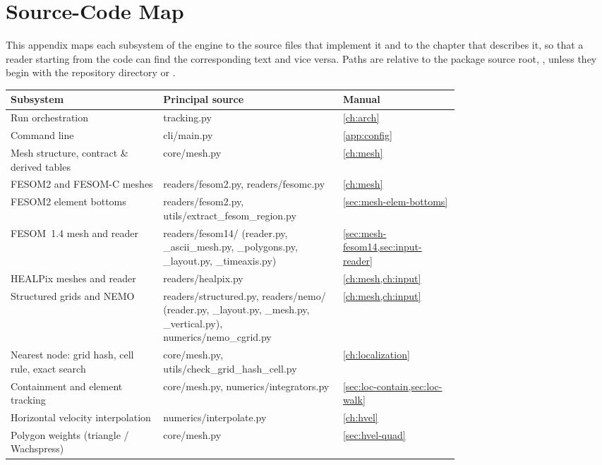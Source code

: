\chapter{Source-Code Map}\label{app:codemap}

This appendix maps each subsystem of the engine to the source files that implement it and to the chapter that
describes it, so that a reader starting from the code can find the corresponding text and vice versa. Paths are
relative to the package source root, , unless they begin with the repository directory
 or .

\begin{longtable}{@{}>{\footnotesize}p{0.34\linewidth} >{\ttfamily\footnotesize\raggedright\arraybackslash}p{0.40\linewidth} >{\footnotesize}l@{}}
\toprule
\normalfont Subsystem & \normalfont Principal source & \normalfont Manual \\
\midrule \endhead
Run orchestration & tracking.py & \cref{ch:arch} \\
Command line & cli/main.py & \cref{app:config} \\
Mesh structure, contract \& derived tables & core/mesh.py & \cref{ch:mesh} \\
FESOM2 and FESOM-C meshes & readers/fesom2.py, readers/fesomc.py & \cref{ch:mesh} \\
FESOM2 element bottoms & readers/fesom2.py, utils/extract\_fesom\_region.py & \cref{sec:mesh-elem-bottoms} \\
FESOM~1.4 mesh and reader & readers/fesom14/ (reader.py, \_ascii\_mesh.py, \_polygons.py, \_layout.py, \_timeaxis.py) & \cref{sec:mesh-fesom14,sec:input-reader} \\
HEALPix meshes and reader & readers/healpix.py & \cref{ch:mesh,ch:input} \\
Structured grids and NEMO & readers/structured.py, readers/nemo/ (reader.py, \_layout.py, \_mesh.py, \_vertical.py), numerics/nemo\_cgrid.py & \cref{ch:mesh,ch:input} \\
Nearest node: grid hash, cell rule, exact search & core/mesh.py, utils/check\_grid\_hash\_cell.py & \cref{ch:localization} \\
Containment and element tracking & core/mesh.py, numerics/integrators.py & \cref{sec:loc-contain,sec:loc-walk} \\
Horizontal velocity interpolation & numerics/interpolate.py & \cref{ch:hvel} \\
Polygon weights (triangle / Wachspress) & core/mesh.py & \cref{sec:hvel-quad} \\

\end{longtable}
